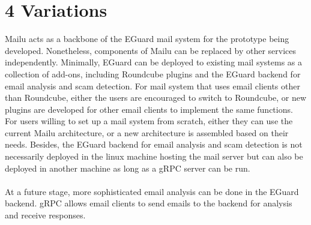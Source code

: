 \documentclass[11pt]{article}
\begin{document}
\section*{\large{4 \hspace{10pt} Variations}}
Mailu acts as a backbone of the EGuard mail system for the prototype being developed. Nonetheless, components of Mailu can be replaced by other services independently. Minimally, EGuard can be deployed to existing mail systems as a collection of add-ons, including Roundcube plugins and the EGuard backend for email analysis and scam detection. For mail system that uses email clients other than Roundcube, either the users are encouraged to switch to Roundcube, or new plugins are developed for other email clients to implement the same functions. For users willing to set up a mail system from scratch, either they can use the current Mailu architecture, or a new architecture is assembled based on their needs. Besides, the EGuard backend for email analysis and scam detection is not necessarily deployed in the linux machine hosting the mail server but can also be deployed in another machine as long as a gRPC server can be run. \\
\\
At a future stage, more sophisticated email analysis can be done in the EGuard backend. gRPC allows email clients to send emails to the backend for analysis and receive responses.

%
%
%
%
%
%
%
\end{document}
